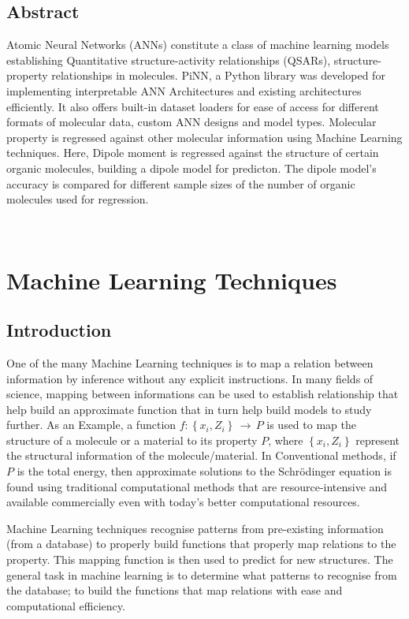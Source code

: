 \documentclass[11pt,a4paper]{report}
\begin{document}
{\begin{center}
	\section*{Abstract}
	\end{center}
Atomic Neural Networks (ANNs) constitute a class of machine learning models establishing Quantitative structure-activity relationships (QSARs), structure-property relationships in molecules. PiNN, a Python library was developed for implementing interpretable ANN Architectures and existing architectures efficiently. It also offers built-in dataset loaders for ease of access for different formats of molecular data, custom ANN designs and model types. Molecular property is regressed against other molecular information using Machine Learning techniques. Here, Dipole moment is regressed against the structure of certain organic molecules, building a dipole model for predicton. The dipole model's accuracy is compared for different sample sizes of the number of organic molecules used for regression.
	
\

	{\tableofcontents}
	\listoffigures
	
\chapter{Machine Learning Techniques}
\section{Introduction}
	
	\large
	
	One of the many Machine Learning techniques is to map a relation between information by inference without any explicit instructions. In many fields of science, mapping between informations can be used to establish relationship that help build an approximate function that in turn help build models to study further. As an Example, a function $f:\left\{x_i, Z_i\right\}\,\to\,P$ is used to map the structure of a molecule or a material to its property $P$, where $\left\{x_i, Z_i\right\}$ represent the structural information of the molecule/material. In Conventional methods, if $P$ is the total energy, then approximate solutions to the Schr{\"o}dinger equation\cite{QM} is found using traditional computational methods that are resource-intensive and available commercially even with today's better computational resources. 

Machine Learning techniques recognise patterns from pre-existing information (from a database) to properly build functions that properly map relations to the property. This mapping function is then used to predict for new structures. The general task in machine learning is to determine what patterns to recognise from the database; to build the functions that map relations with ease and computational efficiency.

}
\end{document}
